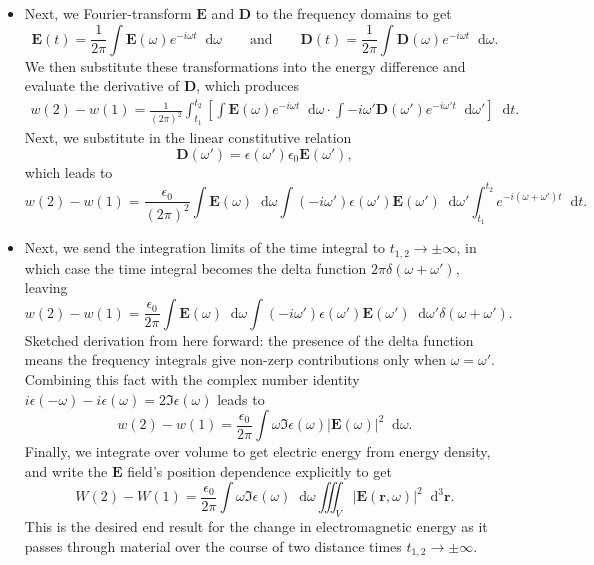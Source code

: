 \documentclass[11pt, a4paper]{article}
\newcommand{\diff}{\mathop{}\!\mathrm{d}} %
\newcommand{\dr}{\diff^{3} \r}  %
\renewcommand{\vec}[1]{\bm{#1}} %
\renewcommand{\r}{\vec{r}}
\newcommand{\E}{\vec{E}} %
\newcommand{\D}{\vec{D}}  %
\newcommand{\ee}{\epsilon_{0}}  %
\begin{document}
\begin{itemize}
    \item Next, we Fourier-transform $ \E $ and $ \D $ to the frequency domains to get
    \begin{equation*}
        \E(t) = \frac{1}{2\pi} \int \E(\omega) e^{-i\omega t} \diff \omega \qquad \text{and} \qquad \D(t) = \frac{1}{2\pi} \int \D(\omega) e^{-i\omega t} \diff \omega.
    \end{equation*}
    We then substitute these transformations into the energy difference and evaluate the derivative of $ \D $, which produces
    \begin{align*}
        w(2) - w(1) = \frac{1}{(2\pi)^{2}}\int_{t_{1}}^{t_{2}} \left[ \int \E(\omega)e^{-i\omega t} \diff \omega \cdot \int -i \omega' \D(\omega')e^{-i\omega't} \diff \omega' \right] \diff t.
    \end{align*}
    Next, we substitute in the linear constitutive relation
    \begin{equation*}
        \D(\omega') = \epsilon(\omega')\ee \E(\omega'),
    \end{equation*}
    which leads to
    \begin{equation*}
        w(2) - w(1) = \frac{\ee}{(2\pi)^{2}} \int \E(\omega) \diff \omega \int  (-i\omega')\epsilon(\omega')\E(\omega') \diff \omega' \int_{t_{1}}^{t_{2}} e^{-i(\omega + \omega')t} \diff t.
    \end{equation*}
    
    \item Next, we send the integration limits of the time integral to $ t_{1, 2} \to \pm \infty $, in which case the time integral becomes the delta function $ 2\pi \delta(\omega + \omega') $, leaving
    \begin{equation*}
        w(2) - w(1) = \frac{\ee}{2\pi} \int \E(\omega) \diff \omega \int  (-i\omega')\epsilon(\omega')\E(\omega') \diff \omega' \delta(\omega + \omega').
    \end{equation*}
    Sketched derivation from here forward: the presence of the delta function means the frequency integrals give non-zerp contributions only when $ \omega = \omega' $. Combining this fact with the complex number identity $ i\epsilon(-\omega) - i \epsilon(\omega) = 2\Im \epsilon(\omega)$ leads to
    \begin{equation*}
        w(2) - w(1) = \frac{\ee}{2\pi} \int \omega \Im \epsilon(\omega) \big |\E(\omega)\big |^{2}  \diff \omega.
    \end{equation*}
    Finally, we integrate over volume to get electric energy from energy density, and write the $ \E $ field's position dependence explicitly to get
    \begin{equation*}
        W(2) - W(1) = \frac{\ee}{2\pi} \int \omega \Im \epsilon(\omega) \diff \omega \iiint_{V} \big |\E(\r, \omega)\big |^{2} \dr.
    \end{equation*}
    This is the desired end result for the change in electromagnetic energy as it passes through material over the course of two distance times $ t_{1,2} \to \pm \infty $.


\end{itemize}
\end{document}
